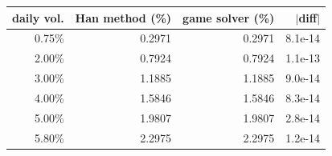 \begin{tabular}{|r|r|r|r|}
\hline
\rowcolor{gray!15}daily vol. & Han method (\%) & game solver (\%) & $|$diff$|$ \\
\hline
0.75\% & 0.2971 & 0.2971 & 8.1e-14 \\
\hline
2.00\% & 0.7924 & 0.7924 & 1.1e-13 \\
\hline
3.00\% & 1.1885 & 1.1885 & 9.0e-14 \\
\hline
4.00\% & 1.5846 & 1.5846 & 8.3e-14 \\
\hline
5.00\% & 1.9807 & 1.9807 & 2.8e-14 \\
\hline
5.80\% & 2.2975 & 2.2975 & 1.2e-14 \\
\hline
\end{tabular}
